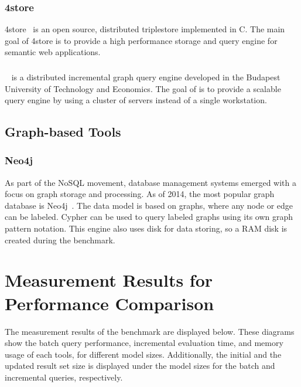 \subsubsection{4store}
4store~\cite{harris20094store} is an open source, distributed triplestore implemented in C. The main goal of 4store is to provide a high performance storage and query engine for semantic web applications. 

\subsubsection{\iqd}
\iqd{}~\cite{Izso:2013:IIG:2487766.2487772} is a distributed incremental graph query engine developed in the Budapest University of Technology and Economics. The goal of \iqd{} is to provide a scalable query engine by using a cluster of servers instead of a single workstation.


\subsection{Graph-based Tools}

\subsubsection{Neo4j}
As part of the NoSQL movement, database management systems emerged with a focus on graph storage and processing. As of 2014, the most popular graph database is 
Neo4j~\cite{neo4j}. The data model is based on graphs, where any node or edge can be labeled. Cypher can be used to query labeled graphs using its own graph pattern notation. This engine also uses disk for data storing, so a RAM disk is created during the benchmark.

\section{Measurement Results for Performance Comparison}

\label{sec:results}

The measurement results of the benchmark are displayed below. These diagrams show the batch query performance, incremental evaluation time, and memory usage of each tools, for different model sizes. Additionally, the initial and the updated result set size is displayed under the model sizes for the batch and incremental queries, respectively.


